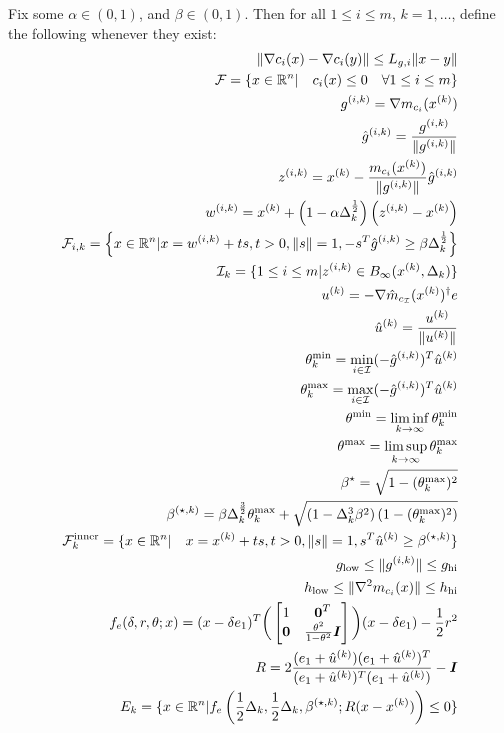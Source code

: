 Fix some $\alpha \in (0, 1)$, and $\beta \in (0, 1)$.
Then for all $1 \le i \le m$, $k = 1, \ldots$, define the following whenever they exist:
\begin{align*}
\|\nabla c_i(x) - \nabla c_i(y)\| \le {L_{g, i}} \|x - y\| \\
{\mathcal F} = \{x \in {\mathbb R^{n}} | \quad c_i(x) \le 0\quad \forall 1 \le i \le m \} \\
{g^{(i, k)}} = \nabla m_{c_i}({x^{(k)}}) \\ 
{{\hat g}^{(i, k)}} = \frac{{g^{(i, k)}}}{\|{g^{(i, k)}}\|} \\
{z^{(i, k)}} = {x^{(k)}} - \frac{m_{c_i}({x^{(k)}})}{\|{g^{(i, k)}}\|}{{\hat g}^{(i, k)}} \\
{w^{(i, k)}} = {x^{(k)}} + \left(1 - \alpha\Delta_k^{\frac 1 2}\right)\left({z^{(i, k)}} - {x^{(k)}}\right) \\
{\mathcal F_{i, k}} = \left\{x \in {\mathbb R^{n}} | x = {w^{(i, k)}} + t s,t > 0, \|s\| = 1, -s^T{{\hat g}^{(i, k)}} \ge \beta \Delta_k^{\frac 1 2 }\right\} \\
{\mathcal I_{k}} = \{1\le i \le m | {z^{(i, k)}} \in B_{\infty}({x^{(k)}}, \Delta_k) \} \\
{u^{(k)}} = -\nabla \hat m_{c_{\mathcal I}}({x^{(k)}})^{\dagger} e\\
{{\hat u}^{(k)}} = \frac {{u^{(k)}}} {\| {u^{(k)}}\|}\\
\theta^{\text{min}}_k = \min_{i \in \mathcal I} (-{{\hat g}^{(i, k)}})^T {{\hat u}^{(k)}} \\
\theta^{\text{max}}_k = \max_{i \in \mathcal I} (-{{\hat g}^{(i, k)}})^T {{\hat u}^{(k)}} \\
\theta^{\text{min}} = \liminf_{k\to\infty} \theta^{\text{min}}_k\\
\theta^{\text{max}} = \limsup_{k\to\infty} \theta^{\text{max}}_k\\
{\beta^{\star}} = \sqrt{ 1 - (\theta^{\text{max}}_k)^2}\\
{\beta^{(\star, k)}} = \beta\Delta_k^{\frac 3 2} \theta^{\text{max}}_k + \sqrt{(1 - \Delta_k^3\beta^2)\left(1 - (\theta^{\text{max}}_k) ^2\right)} \\
{\mathcal {F}^{\text{inner}}_k} = \{x \in {\mathbb R^{n}} | \quad x = {x^{(k)}} + ts, t > 0, \|s\| = 1, s^T{{\hat u}^{(k)}} \ge {\beta^{(\star, k)}} \} \\
g_{\text{low}} \le \|{g^{(i, k)}}\| \le g_{\text{hi}} \\
h_{\text{low}} \le \|\nabla^2m_{c_i}(x)\| \le h_{\text{hi}} \\
f_e(\delta, r, \theta; x) = (x - \delta e_1)^T\bigg(\begin{bmatrix}
1 & \boldsymbol0^T \\
\boldsymbol 0 & \frac{\theta^2}{1 - \theta^2} \boldsymbol I \\
\end{bmatrix}\bigg)(x - \delta e_1) - \frac 1 2 r^2 \\
R = 2\frac{(e_1 + {{\hat u}^{(k)}})(e_1 + {{\hat u}^{(k)}})^T}{(e_1 + {{\hat u}^{(k)}})^T(e_1 + {{\hat u}^{(k)}})} - \boldsymbol I \\
E_k = \{x \in {\mathbb R^{n}} | f_e\left(\frac 1 2 \Delta_k, \frac 1 2 \Delta_k, {\beta^{(\star, k)}}; R(x - {x^{(k)}})\right) \le 0\}
\end{align*}


